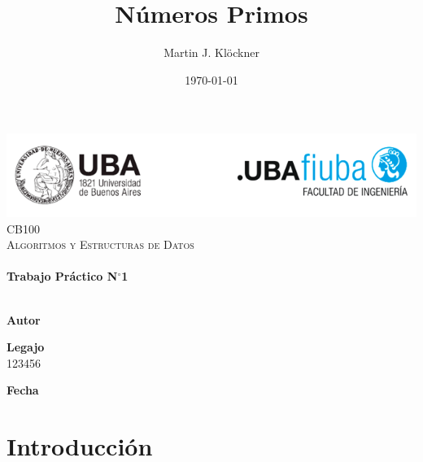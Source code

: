 \documentclass[12pt]{article}
\title{Números Primos}          %
\author{Martin J. Klöckner}     %
\date{\today}                   %
\makeatletter
\newcommand{\padron}{123456}    %
\newcommand{\tpnumber}{1}       %
\let\thetitle\@title
\let\theauthor\@author
\let\thedate\@date
\makeatother
\begin{document}
\begin{titlepage}
    \vspace*{-2.5cm}
    {\centering
    \includegraphics[width=1.00\textwidth]{img/logofiuba.png}\\[2.25 cm]}
    \centering
    \textsc{\Large CB100}\\[0.2 cm]
    \textsc{\large Algoritmos y Estructuras de Datos}\\[4 cm]
    \textcolor{cyan}{{\fontsize{40}{60}\selectfont \bfseries \thetitle}}\\[0.5cm]
    {\Large \bfseries Trabajo Práctico N$^\circ$\tpnumber}\\[5cm]


    \vfill
    \noindent\makebox[\linewidth]{\rule{\textwidth}{0.4pt}}\\[0.5cm]
    \begin{minipage}{.46\textwidth}
    \textbf{Autor}\\
    \theauthor
    \end{minipage}%
    \begin{minipage}{.34\textwidth}
    \textbf{Legajo}\\
    \padron
    \end{minipage}%
    \begin{minipage}{.2\textwidth}
     \begin{flushright}
        \textbf{Fecha}\\
        \thedate
    \end{flushright}
    \end{minipage}
\end{titlepage}


{
    \hypersetup{linkcolor=black} %
    \tableofcontents
    \pagebreak
}


\section{Introducción}
\end{document}
